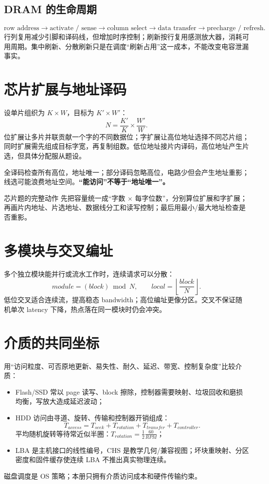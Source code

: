 \documentclass[UTF8,fontset=fandol,11pt,a4paper]{ctexart}
\newcommand{\kw}[1]{\textbf{\color{deep}#1}}\newcommand{\code}[1]{\texttt{#1}}
\begin{document}
\subsection{DRAM 的生命周期}
\[
\text{row address}\to\text{activate / sense}\to\text{column select}\to\text{data transfer}\to\text{precharge / refresh}.
\]
行列复用减少引脚和译码线，但增加时序控制；刷新按行复用感测放大器，消耗可用周期。集中刷新、分散刷新只是在调度“刷新占用”这一成本，不能改变电容泄漏事实。

\section{芯片扩展与地址译码}
设单片组织为 $K\times W$，目标为 $K'\times W'$：
\[
N=\frac{K'}K\times\frac{W'}W.
\]
位扩展让多片并联贡献一个字的不同数据位；字扩展让高位地址选择不同芯片组；同时扩展需先组成目标字宽，再复制组数。低位地址接片内译码，高位地址产生片选，但具体分配服从题设。

全译码检查所有高位，地址唯一；部分译码忽略高位，电路少但会产生地址重影；线选可能浪费地址空间。\kw{“能访问”不等于“地址唯一”。}

\begin{examplebox}{芯片题的完整动作}
先把容量统一成“字数 × 每字位数”，分别算位扩展和字扩展；再画片内地址、片选地址、数据线分工和读写控制；最后用最小/最大地址检查是否重影。
\end{examplebox}

\section{多模块与交叉编址}
多个独立模块能并行或流水工作时，连续请求可以分散：
\[
module=(block)\bmod N,\qquad local=\left\lfloor\frac{block}{N}\right\rfloor.
\]
低位交叉适合连续流，提高稳态 bandwidth；高位编址更像分区。交叉不保证随机单次 latency 下降，热点落在同一模块时仍会冲突。

\section{介质的共同坐标}
用“访问粒度、可否原地更新、易失性、耐久、延迟、带宽、控制复杂度”比较介质：
\begin{itemize}
\item Flash/SSD 常以 page 读写、block 擦除，控制器需要映射、垃圾回收和磨损均衡，写放大造成延迟波动；
\item HDD 访问由寻道、旋转、传输和控制器开销组成：
\[
T_{access}=T_{seek}+T_{rotation}+T_{transfer}+T_{controller}.
\]
平均随机旋转等待常近似半圈：$T_{rotation}=\frac12\frac{60}{RPM}$；
\item LBA 是主机接口的线性编号，CHS 是教学几何/兼容视图；坏块重映射、分区密度和固件缓存使连续 LBA 不推出真实物理连续。
\end{itemize}
磁盘调度是 OS 策略；本册只拥有介质访问成本和硬件传输约束。
\end{document}

